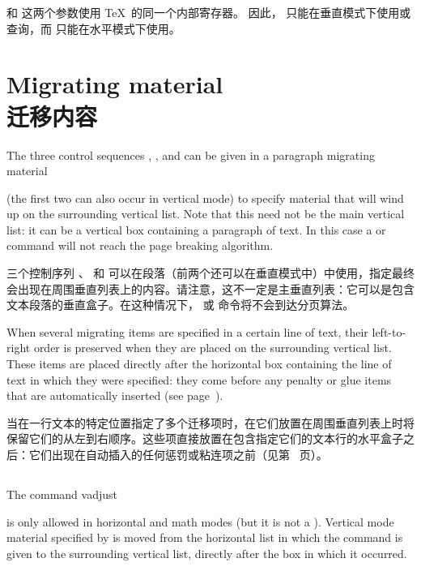 \documentclass[twoside,letterpaper]{rapport3}
\begin{document}
 和  这两个参数使用 \TeX\ 的同一个内部寄存器。
因此， 只能在垂直模式下使用或查询，而  只能在水平模式下使用。

\section{Migrating material\\迁移内容}
\label{migrate}

The three control sequences , , and 
can be given in a paragraph 
\term migrating material\par
(the first two can also occur
in vertical mode) to specify material that will wind up on the
surrounding vertical list. Note that this need not be 
the main vertical list: it can be a vertical box
containing a paragraph of text. In this case a 
or  command will not reach the page breaking algorithm.

三个控制序列 、 和  可以在段落（前两个还可以在垂直模式中）中使用，指定最终会出现在周围垂直列表上的内容。请注意，这不一定是主垂直列表：它可以是包含文本段落的垂直盒子。在这种情况下， 或  命令将不会到达分页算法。

When several migrating items are specified in a certain line
of text, their left-to-right order is preserved when they are
placed on the surrounding vertical list. These items are placed
directly after the horizontal box containing the line of text
in which they were specified: they come before any
penalty or glue items that are automatically inserted
(see page~\pageref{between:lines}).

当在一行文本的特定位置指定了多个迁移项时，在它们放置在周围垂直列表上时将保留它们的从左到右顺序。这些项直接放置在包含指定它们的文本行的水平盒子之后：它们出现在自动插入的任何惩罚或粘连项之前（见第~\pageref{between:lines} 页）。

\subsection{}

The command
\cstoidx vadjust\par
\begin{disp}\lb{}\rb\end{disp}
\awp
is only allowed in horizontal and math modes (but it is
not a ).
Vertical mode material specified by  is moved from
the horizontal list in which the command is given
to the surrounding vertical list, directly after the box
in which it occurred.
\end{document}
